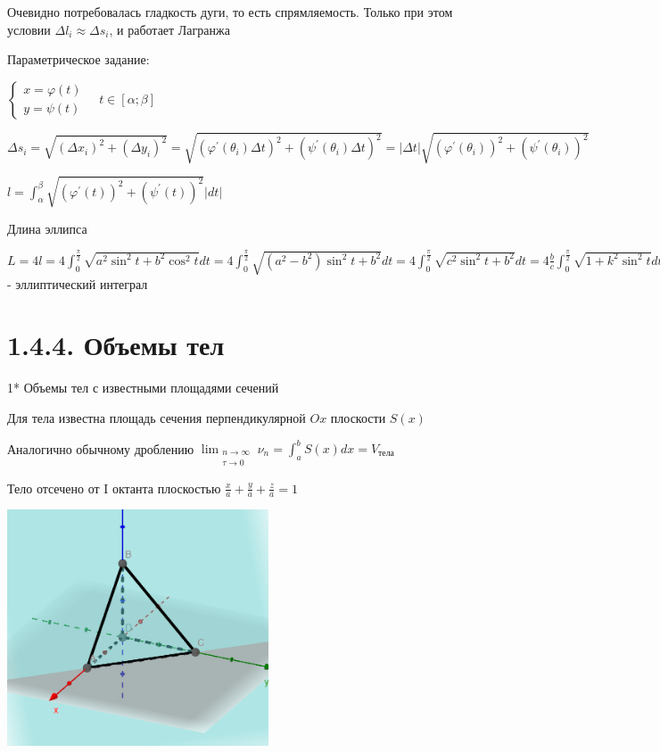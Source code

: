 \documentclass[12pt]{article}
\begin{document}
    \Nota Очевидно потребовалась гладкость дуги, то есть спрямляемость. Только при этом условии $\Delta l_i \approx \Delta s_i$, и работает \Ths Лагранжа

    Параметрическое задание:

    $\begin{cases}x = \varphi(t) \\ y = \psi(t)\end{cases} \quad t \in [\alpha;\beta]$

    $\Delta s_i = \sqrt{(\Delta x_i)^2 + (\Delta y_i)^2} = \sqrt{(\varphi^\prime(\theta_i) \Delta t)^2 + (\psi^\prime(\theta_i) \Delta t)^2} =
    |\Delta t|\sqrt{(\varphi^\prime(\theta_i))^2 + (\psi^\prime(\theta_i))^2}$

    $l = \int^\beta_\alpha \sqrt{(\varphi^\prime(t))^2 + (\psi^\prime(t))^2} |dt|$

    \Ex Длина эллипса

    $L = 4l = 4 \int^\frac{\pi}{2}_0 \sqrt{a^2 \sin^2 t + b^2 \cos^2 t} dt =
    4 \int^\frac{\pi}{2}_0 \sqrt{(a^2 - b^2) \sin^2 t + b^2} dt =
    4 \int^\frac{\pi}{2}_0 \sqrt{c^2 \sin^2 t + b^2} dt = 4 \frac{b}{c} \int^\frac{\pi}{2}_0 \sqrt{1 + k^2 \sin^2 t} dt$ - эллиптический интеграл

    \section{1.4.4. Объемы тел}

    1* \hypertarget{volumeofbodieswithknownarea}{Объемы тел с известными площадями сечений}

    Для тела известна площадь сечения перпендикулярной $Ox$ плоскости $S(x)$

    Аналогично обычному дроблению $\lim_{\substack{n \to \infty \\ \tau \to 0}} \nu_n = \int^b_a S(x)dx = V_\text{тела}$

    \Ex Тело отсечено от I октанта плоскостью $\frac{x}{a} + \frac{y}{a} + \frac{z}{a} = 1$

    \includegraphics[height=7cm]{calculus/images/calculus_2024_02_14_2}
\end{document}
